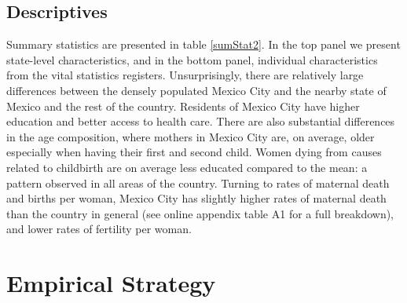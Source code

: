 \documentclass[a4paper,11pt]{article}
\begin{document}
\begin{spacing}{1.5}
\subsection{Descriptives}
Summary statistics are presented in table \ref{sumStat2}.  In the top panel we present state-level characteristics, and in the bottom panel, individual characteristics from the vital statistics registers.  Unsurprisingly, there are relatively large differences between the densely populated Mexico City and the nearby state of Mexico and the rest of the country.  Residents of Mexico City have higher education and better access to health care. There are also substantial differences in the age composition, where mothers in Mexico City are, on average, older especially when having their first and second child.  Women dying from causes related to childbirth are on average less educated compared to the mean: a pattern observed in all areas of the country.  Turning to rates of maternal death and births per woman, Mexico City has slightly higher rates of maternal death than the country in general (see online appendix table A1 for a full breakdown), and lower rates of fertility per woman.  

\section{Empirical Strategy} \label{methodology}

\end{spacing}
\end{document}
